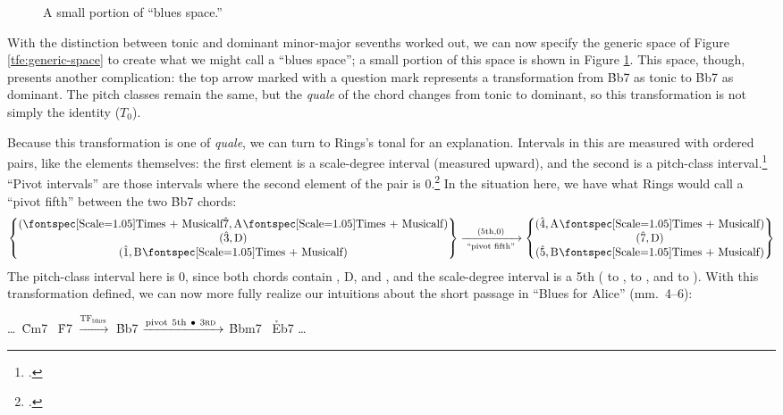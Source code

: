 \begin{figure}[tbp]
  \caption{A small portion of ``blues \tf space.''}
  \label{tfe:blues-tf-space}
\end{figure}

With the distinction between tonic and dominant minor-major sevenths worked
out, we can now specify the generic space of Figure \ref{tfe:generic-space} to
create what we might call a ``blues \tf space''; a small portion of this space
is shown in Figure \ref{tfe:blues-tf-space}. This space, though, presents
another complication: the top arrow marked with a question mark represents a
transformation  from \h{Bb7} as tonic to \h{Bb7} as dominant.
The pitch classes remain the same, but the \emph{quale} of the chord
changes from tonic to dominant, so this transformation is not simply the
identity ($T_0$).

Because this transformation is one of \emph{quale}, we can turn to Rings's
tonal \gis for an explanation. Intervals in this \gis are measured with
ordered pairs, like the elements themselves: the first element is a
scale-degree interval (measured upward), and the second is a pitch-class
interval.\footcite[46--48]{rings:2011} ``Pivot intervals'' are those intervals
where the second element of the pair is $0$.\footcite[58--66]{rings:2011} In
the situation here, we have what Rings would call a ``pivot fifth'' between
the two \h{Bb7} chords:
%
\begin{displaymath}
  \setlength{\arraycolsep}{3em}
    \begin{Bmatrix}
      (\text{\flat\sd7}, \text{\Aflat}) \\
      (\text{\sd3},      \text{D}) \\
      (\text{\sd1},      \text{\Bflat})
    \end{Bmatrix}
    \xrightarrow[\text{ ``pivot fifth'' }]{(5\mathrm{th}, 0)}
    \begin{Bmatrix}
      (\text{\sd4}, \text{\Aflat}) \\
      (\text{\sd7}, \text{D}) \\
      (\text{\sd5}, \text{\Bflat})
    \end{Bmatrix}
\end{displaymath}
%
The pitch-class interval here is 0, since both chords contain \Bflat, D, and
\Aflat, and the scale-degree interval is a 5th ( to ,  to , and
\flat{} to ). With this transformation defined, we can now more fully
realize our intuitions about the short passage in ``Blues for Alice'' (mm.~4--6):
\begin{center}
  \ldots\ \h{Cm7} \TFarrow\ \h{F7} $\xrightarrow{\mathrm{TF}_{\mathrm{blues}}\ }$
  \h{Bb7} $\xrightarrow{\mathrm{ pivot\ 5th}\ \bullet\ 3\text{\textsc{rd} }}$
  \h{Bbm7} \TFarrow\ \h{Eb7} \ldots
\end{center}

